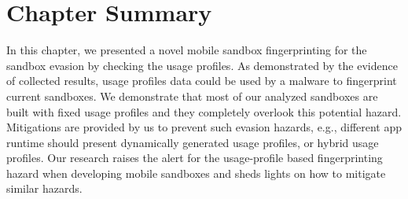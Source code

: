 \section{Chapter Summary}
In this chapter, we presented a novel  mobile sandbox fingerprinting for the sandbox evasion by checking the usage profiles. As demonstrated by the evidence of collected results, usage profiles data could be used by a malware to fingerprint current sandboxes. We demonstrate that most of our analyzed sandboxes are built with fixed usage profiles and they completely overlook this potential hazard. Mitigations are provided by us to prevent such evasion hazards, e.g., different app runtime should present dynamically generated usage profiles, or hybrid usage profiles. Our research raises the alert for the usage-profile based fingerprinting hazard when developing mobile sandboxes and sheds lights on how to mitigate similar hazards. 
